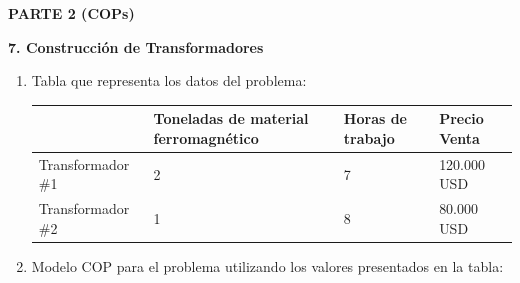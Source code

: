 \documentclass[12pt]{article}
\begin{document}
\newpage

\begin{center}
\large
\textbf{PARTE 2 (COPs)}
\end{center}

\begin{flushleft}
\textbf{7. Construcción de Transformadores}
\end{flushleft}

\begin{enumerate}[label=\alph*]
\item Tabla que representa los datos del problema:


\begin{table}[h]
\begin{tabular}{|l|l|l|l|}
\hline
                  & Toneladas de material ferromagnético & Horas de trabajo & Precio Venta \\ \hline
Transformador \#1 & 2                                                           & 7                                      & 120.000 USD \\ \hline
Transformador \#2 & 1                                                           & 8                                      & 80.000 USD \\ \hline
\end{tabular}
\end{table}

\item Modelo COP para el problema utilizando los valores presentados en la tabla:


\end{enumerate}
\end{document}
